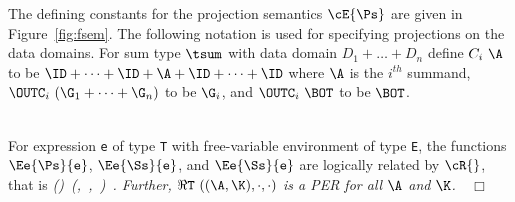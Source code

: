
The defining constants for the projection semantics $\cE{\Ps}$ are
given in Figure~\ref{fig:fsem}. The following notation is used for
specifying projections on the data domains.  For sum type $\tsum$ with
data domain $D_1\plus\ldots\plus D_n$ define $C_i~\A$ to be
$\ID+\cdots+\ID+\A+\ID+\cdots+\ID$ where $\A$ is the $i^{th}$ summand,
$\OUTC_i~(\G_1+\cdots+\G_n)$ to be $\G_i$, and $\OUTC_i~\BOT$ to be
$\BOT$.

\ \\
  For expression \mbox{\tt e} of type \mbox{\tt T} with free-variable
environment of type \mbox{\tt E}, the functions $\Ee{\Ps}{\mbox{\tt e}}$,
$\Ee{\Ss}{\mbox{\tt e}}$, and $\Ee{\Ss}{\mbox{\tt e}}$ are logically related by $\cR{}$,
that is
\beqs
\it (\fto{})\ (,\ ,\ )\ .
\eeqs
Further, $\Re{}{\mbox{\tt T}}~((\A,\K),\cdot,\cdot)$ is a PER for all $\A$ and $\K$.\ \ $\Box$

